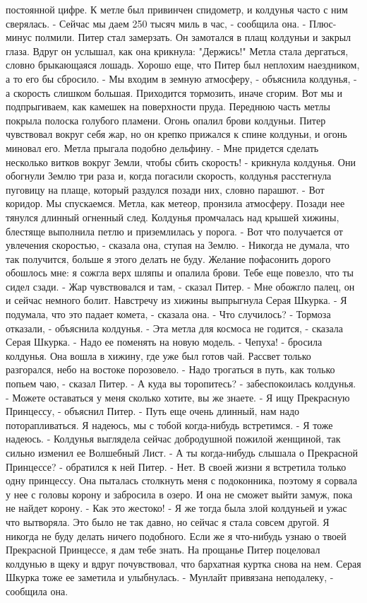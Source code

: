 постоянной цифре. К метле был привинчен спидометр, и колдунья часто с 
ним сверялась.
    - Сейчас мы даем 250 тысяч миль в час, - сообщила она. - Плюс-
минус полмили.
    Питер стал замерзать. Он замотался в плащ колдуньи и закрыл глаза.
    Вдруг он услышал, как она крикнула: "Держись!" Метла стала 
дергаться, словно брыкающаяся лошадь. Хорошо еще, что Питер был 
неплохим наездником, а то его бы сбросило.
    - Мы входим в земную атмосферу, - объяснила колдунья, - а скорость 
слишком большая. Приходится тормозить, иначе сгорим. Вот мы и 
подпрыгиваем, как камешек на поверхности пруда.
    Переднюю часть метлы покрыла полоска голубого пламени. Огонь 
опалил брови колдуньи. Питер чувствовал вокруг себя жар, но он крепко 
прижался к спине колдуньи, и огонь миновал его. Метла прыгала подобно 
дельфину.
    - Мне придется сделать несколько витков вокруг Земли, чтобы сбить 
скорость! - крикнула колдунья.
    Они обогнули Землю три раза и, когда погасили скорость, колдунья 
расстегнула пуговицу на плаще, который раздулся позади них, словно 
парашют.
    - Вот коридор. Мы спускаемся.
    Метла, как метеор, пронзила атмосферу. Позади нее тянулся длинный 
огненный след. Колдунья промчалась над крышей хижины, блестяще 
выполнила петлю и приземлилась у порога.
    - Вот что получается от увлечения скоростью, - сказала она, ступая 
на Землю. - Никогда не думала, что так получится, больше я этого 
делать не буду. Желание пофасонить дорого обошлось мне: я сожгла верх 
шляпы и опалила брови. Тебе еще повезло, что ты сидел сзади.
    - Жар чувствовался и там, - сказал Питер. - Мне обожгло палец, он 
и сейчас немного болит.
    Навстречу из хижины выпрыгнула Серая Шкурка.
    - Я подумала, что это падает комета, - сказала она. - Что 
случилось?
    - Тормоза отказали, - объяснила колдунья.
    - Эта метла для космоса не годится, - сказала Серая Шкурка. - Надо 
ее поменять на новую модель.
    - Чепуха! - бросила колдунья. Она вошла в хижину, где уже был 
готов чай.
    Рассвет только разгорался, небо на востоке порозовело.
    - Надо трогаться в путь, как только попьем чаю, - сказал Питер.
    - А куда вы торопитесь? - забеспокоилась колдунья. - Можете 
оставаться у меня сколько хотите, вы же знаете.
    - Я ищу Прекрасную Принцессу, - объяснил Питер. - Путь еще очень 
длинный, нам надо поторапливаться. Я надеюсь, мы с тобой когда-нибудь 
встретимся.
    - Я тоже надеюсь. - Колдунья выглядела сейчас добродушной пожилой 
женщиной, так сильно изменил ее Волшебный Лист.
    - А ты когда-нибудь слышала о Прекрасной Принцессе? - обратился к 
ней Питер.
    - Нет. В своей жизни я встретила только одну принцессу. Она 
пыталась столкнуть меня с подоконника, поэтому я сорвала у нее с 
головы корону и забросила в озеро. И она не сможет выйти замуж, пока 
не найдет корону.
    - Как это жестоко!
    - Я же тогда была злой колдуньей и ужас что вытворяла. Это было не 
так давно, но сейчас я стала совсем другой. Я никогда не буду делать 
ничего подобного. Если же я что-нибудь узнаю о твоей Прекрасной 
Принцессе, я дам тебе знать.
    На прощанье Питер поцеловал колдунью в щеку и вдруг почувствовал, 
что бархатная куртка снова на нем. Серая Шкурка тоже ее заметила и 
улыбнулась.
    - Мунлайт привязана неподалеку, - сообщила она.
